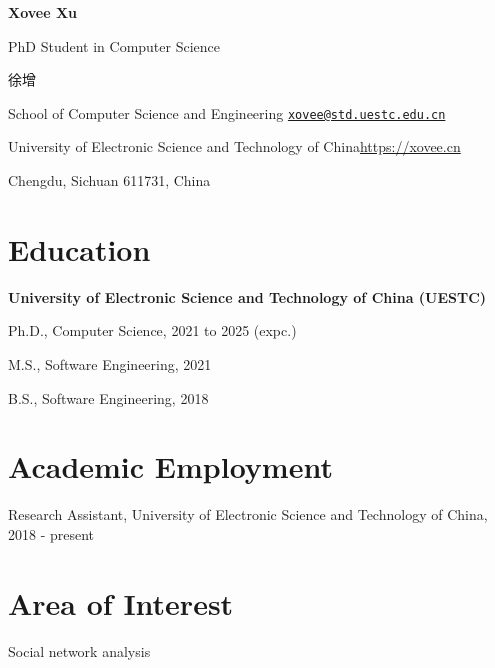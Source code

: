 \documentclass{article}
\begin{document}
\begin{center}
    \vspace*{10pt}
    \Huge{
    \textbf{Xovee Xu}}
\end{center}
\vspace{10pt}

\setlength{\parskip}{1pt}

\noindent PhD Student in Computer Science \hfill \begin{CJK*}{UTF8}{gbsn}徐增\end{CJK*}

\noindent School of Computer Science and Engineering \hfill \href{mailto:xovee@std.uestc.edu.cn}{\texttt{xovee@std.uestc.edu.cn}}

\noindent University of Electronic Science and Technology of China\hfill \url{https://xovee.cn}

\noindent Chengdu, Sichuan 611731, China


\setlength{\parskip}{3pt}

\section*{Education}
\indent 

\textbf{University of Electronic Science and Technology of China (UESTC)}

\hspace{2em}Ph.D., Computer Science, 2021 to 2025 (expc.)

\hspace{2em}M.S., Software Engineering, 2021

\hspace{2em}B.S., Software Engineering, 2018

\section*{Academic Employment}
\indent

Research Assistant, University of Electronic Science and Technology of China, 2018 - present



\section*{Area of Interest}
\indent

Social network analysis
\end{document}
